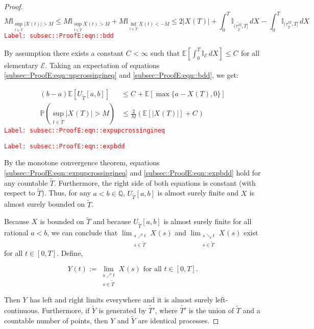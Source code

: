 \documentclass[12pt]{article}
\newcommand{\mb}{\mathbb}
\newcommand{\mc}{\mathcal}
\newcommand{\te}{\text}
\newcommand{\tr}{\textcolor{red}}
\newcommand{\labe}[1]{\tr{\texttt{Label: #1}}}
\newcommand{\ind}{\hspace{24pt}}
\newcommand{\pr}{\mb{P}}							%
\newcommand{\ex}[1]{\mb{E}\left[#1\right]}			%
\newcommand{\T}{T}								%
\renewcommand{\t}{t}							%
\renewcommand{\tt}{s}							%
\newcommand{\rt}[1]{\tau^{#1}}						%
\newcommand{\rxvt}[2]{X_{#1}{(#2)}}					%
\newcommand{\rxvtt}[2]{Y_{#1}{(#2)}}				%
\newcommand{\rxvts}[2]{X_{#1}{#2}}					%
\newcommand{\rxvtts}[2]{Y_{#1}{#2}}					%
\newcommand{\const}[1]{C_{#1}}						%
\newcommand{\alt}{\widetilde}						%
\newcommand{\evnt}{\mc{E}}						%
\begin{document}
\begin{proof}
\begin{equation}
M\mb{I}_{\sup_{\t\in\alt{T}}|\rxvt{}{\t}| > M} \leq M\mb{I}_{\sup_{\t\in\alt{T}}\rxvt{}{\t} > M} + M\mb{I}_{\inf_{\t\in\alt{T}}\rxvt{}{\t} < -M} \leq 2|\rxvt{}{\T}| + \int_0^\T \mb{I}_{(\alt{\rt{M}_{\alt{T}}},\T]}\,d\rxvts{}{} - \int_0^\T \mb{I}_{(\rt{M}_{\alt{T}},\T]}\,d\rxvts{}{}
\label{subsec::ProofE:eqn::bdd}
\end{equation}
\labe{subsec::ProofE:eqn::bdd}

By assumption there exists a constant \(\const{} < \infty\) such that \(\ex{\int_0^\T \mb{I}_{\evnt}\,d\rxvts{}{}} \leq \const{}\) for all elementary \(\evnt\). Taking an expectation of equations \eqref{subsec::ProofE:eqn::upcrossingineq} and \eqref{subsec::ProofE:eqn::bdd}, we get:

\begin{align}
(b-a)\ex{U_{\alt{T}}[a,b]} &\leq \const{} + \ex{\max\{a-\rxvt{}{\T},0\}}
\label{subsec::ProofE:eqn::expupcrossingineq}\\
\pr\left(\sup_{\t\in\alt{T}} |\rxvt{}{\T}| > M\right) &\leq \frac{2}{M}\left(\ex{|\rxvt{}{\T}|} + \const{}\right)
\label{subsec::ProofE:eqn::expbdd}
\end{align}
\labe{subsec::ProofE:eqn::expupcrossingineq}

\labe{subsec::ProofE:eqn::expbdd}

By the monotone convergence theorem, equations \eqref{subsec::ProofE:eqn::expupcrossingineq} and \eqref{subsec::ProofE:eqn::expbdd} hold for any countable \(\alt{T}\). Furthermore, the right side of both equations is constant (with respect to \(\alt{T}\)). Thus, for any \(a < b \in \mb{Q}\), \(U_{\alt{T}}[a,b]\) is almost surely finite and \(\rxvts{}{}\) is almost surely bounded on \(\alt{T}\).

\ind Because \(\rxvts{}{}\) is bounded on \(\alt{T}\) and because \(U_{\alt{T}}[a,b]\) is almost surely finite for all rational \(a < b\), we can conclude that \(\lim_{\substack{\tt \nearrow \t\\ \tt \in \alt{T}}} \rxvt{}{\tt}\) and \(\lim_{\substack{\tt \searrow \t\\ \tt \in \alt{T}}} \rxvt{}{\tt}\) exist for all \(\t \in [0,\T]\). Define,

\[\rxvtt{}{\t} := \lim_{\substack{\tt \nearrow \t\\\tt \in \alt{T}}} \rxvt{}{\tt}\te{ for all } \t \in [0,\T].\]

Then \(\rxvtts{}{}\) has left and right limits everywhere and it is almost surely left-continuous. Furthermore, if \(\alt{\rxvtts{}{}}\) is generated by \(\alt{T'}\), where \(\alt{T'}\) is the union of \(\alt{T}\) and a countable number of points, then \(\rxvtts{}{}\) and \(\alt{\rxvtts{}{}}\) are identical processes. 


\end{proof}
\end{document}
